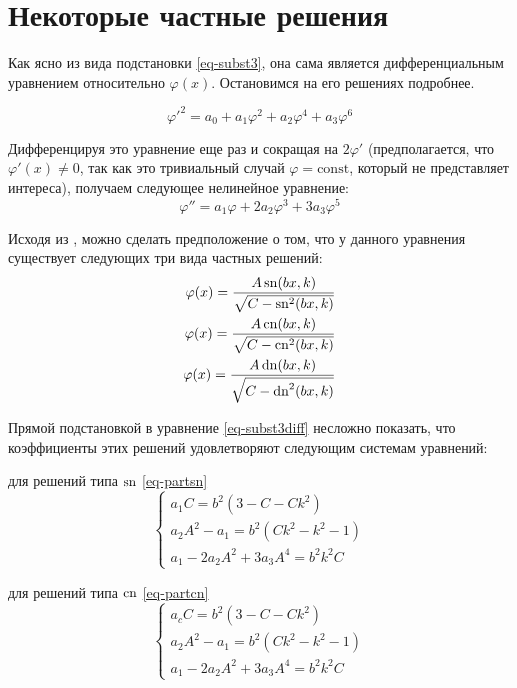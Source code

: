 \section{Некоторые частные решения}\label{sec-part}

Как ясно из вида подстановки \eqref{eq-subst3}, она сама является дифференциальным уравнением относительно $\varphi(x)$. Остановимся на его решениях подробнее.

\begin{equation}
\varphi'^2 = a_0 + a_1\varphi^2 + a_2\varphi^4 + a_3\varphi^6
\end{equation}

Дифференцируя это уравнение еще раз и сокращая на $2\varphi'$
(предполагается, что $\varphi'(x) \ne 0$, так как это тривиальный случай $\varphi = \mathrm{const}$, который не представляет интереса), получаем следующее нелинейное уравнение:
\begin{equation}
\varphi'' = a_1\varphi + 2a_2\varphi^3 + 3a_3\varphi^5
\label{eq-subst3diff}
\end{equation}

Исходя из \cite{Ishibashi1984, Kovalev1976}, можно сделать предположение о том, что у данного уравнения существует следующих три вида частных решений:
\begin{align}
\varphi(x) = \frac{A\operatorname{sn}(bx,k)}{\sqrt{C-\operatorname{sn}^2(bx,k)}}\label{eq-partsn}\\
\varphi(x) = \frac{A\operatorname{cn}(bx,k)}{\sqrt{C-\operatorname{cn}^2(bx,k)}}\label{eq-partcn}\\
\varphi(x) = \frac{A\operatorname{dn}(bx,k)}{\sqrt{C-\operatorname{dn}^2(bx,k)}}\label{eq-partdn}
\end{align}

Прямой подстановкой в уравнение \eqref{eq-subst3diff} несложно показать, что коэффициенты этих решений удовлетворяют следующим системам уравнений:

для решений типа $\operatorname{sn}$ \eqref{eq-partsn}
\begin{equation}
\begin{cases}
a_1 C = b^2 \left(3 - C - Ck^2\right) \\
a_2 A^2 - a_1 = b^2\left(Ck^2 - k^2 - 1\right)\\
a_1 - 2a_2 A^2 + 3a_3 A^4 = b^2 k^2 C
\end{cases}
\end{equation}

для решений типа $\operatorname{cn}$ \eqref{eq-partcn}
\begin{equation}
\begin{cases}
a_c C = b^2 \left(3 - C - Ck^2\right)\\
a_2 A^2 - a_1 = b^2\left(Ck^2 - k^2 - 1\right)\\
a_1 - 2a_2 A^2 + 3a_3 A^4 = b^2k^2C
\end{cases}
\end{equation}

